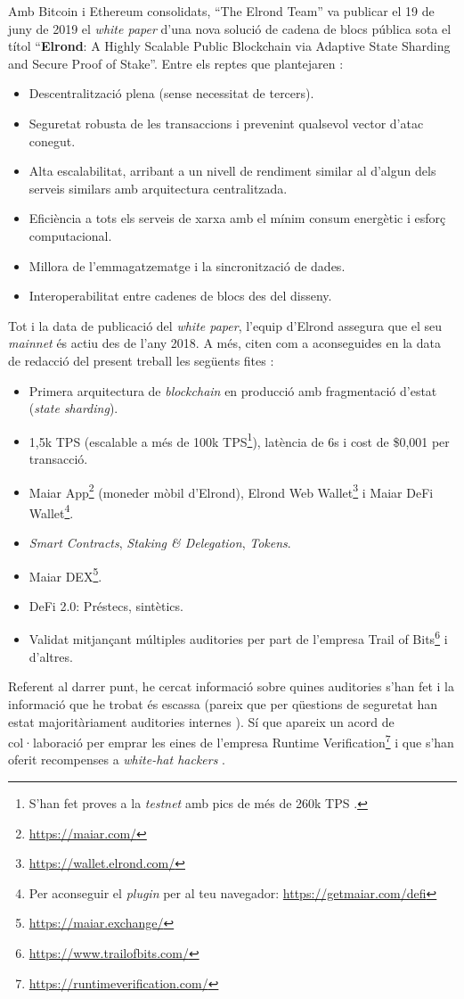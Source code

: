 \documentclass[11pt,a4paper]{article}
\begin{document}
Amb Bitcoin i Ethereum consolidats, ``The Elrond Team'' va publicar el 19 de juny de 2019 el \textit{white paper} d'una nova solució de cadena de blocs pública sota el títol ``\textbf{Elrond}: A Highly Scalable Public Blockchain via Adaptive State Sharding and Secure Proof of Stake''. Entre els reptes que plantejaren \cite{elrond2022}\cite{elrond2019}:
\begin{itemize}
    \item Descentralització plena (sense necessitat de tercers).
    \item Seguretat robusta de les transaccions i prevenint qualsevol vector d'atac conegut.
    \item Alta escalabilitat, arribant a un nivell de rendiment similar al d'algun dels serveis similars amb arquitectura centralitzada.
    \item Eficiència a tots els serveis de xarxa amb el mínim consum energètic i esforç computacional.
    \item Millora de l'emmagatzematge i la sincronització de dades.
    \item Interoperabilitat entre cadenes de blocs des del disseny.
\end{itemize}
Tot i la data de publicació del \textit{white paper}, l'equip d'Elrond assegura que el seu \textit{mainnet} és actiu des de l'any 2018. A més, citen com a aconseguides en la data de redacció del present treball les següents fites \cite{elrond2022}\cite{mincul2021}:
\begin{itemize}
    \item Primera arquitectura de \textit{blockchain} en producció amb fragmentació d'estat (\textit{state sharding}).
    \item 1,5k TPS (escalable a més de 100k TPS\footnote{S'han fet proves a la \textit{testnet} amb pics de més de 260k TPS \cite{elrond2022}.}), latència de 6s i cost de \$0,001 per transacció.
    \item Maiar App\footnote{\url{https://maiar.com/}} (moneder mòbil d'Elrond), Elrond Web Wallet\footnote{\url{https://wallet.elrond.com/}} i Maiar DeFi Wallet\footnote{Per aconseguir el \textit{plugin} per al teu navegador: \url{https://getmaiar.com/defi}}.
    \item \textit{Smart Contracts}, \textit{Staking \& Delegation}, \textit{Tokens}.
    \item Maiar DEX\footnote{\url{https://maiar.exchange/}}.
    \item DeFi 2.0: Préstecs, sintètics.
    \item Validat mitjançant múltiples auditories per part de l'empresa Trail of Bits\footnote{\url{https://www.trailofbits.com/}} i d'altres.
\end{itemize}
Referent al darrer punt, he cercat informació sobre quines auditories s'han fet i la informació que he trobat és escassa (pareix que per qüestions de seguretat han estat majoritàriament auditories internes \cite{mincub2019}). Sí que apareix un acord de col·laboració per emprar les eines de l'empresa Runtime Verification\footnote{\url{https://runtimeverification.com/}} i que s'han oferit recompenses a \textit{white-hat hackers} \cite{bounties01}\cite{mincub2021}.
\end{document}
